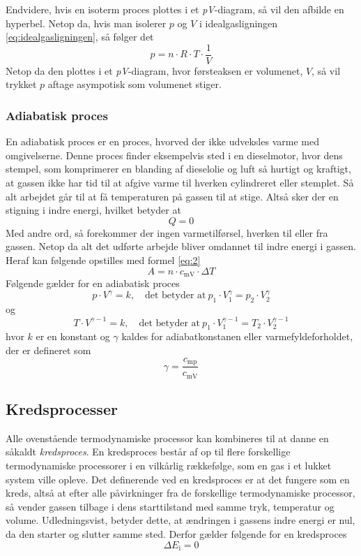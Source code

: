 \documentclass[SRC.tex]{subfiles}
\begin{document}
	Endvidere, hvis en isoterm proces plottes i et \textit{pV}-diagram, så 
	vil den afbilde en hyperbel. Netop da, hvis man isolerer \(p\) og \(V\)
	i idealgasligningen \eqref{eq:idealgasligningen}, så følger det
	\begin{equation}
	p = n \cdot R \cdot T \cdot \frac{1}{V}
	\end{equation}
	Netop da den plottes i et \textit{pV}-diagram, hvor førsteaksen er volumenet,
	\(V\), så vil trykket \(p\) aftage asympotisk som volumenet stiger. 
	\subsubsection{Adiabatisk proces}
	En adiabatisk proces er en proces, hvorved der ikke udveksles varme med 
	omgivelserne. Denne proces finder eksempelvis sted i en dieselmotor, hvor dens 
	stempel, som komprimerer en blanding af dieselolie og luft så hurtigt og kraftigt,
	at gassen ikke har tid til at afgive varme til hverken cylindreret eller stemplet. Så alt arbejdet går til at få temperaturen på gassen til at stige. Altså sker der en stigning i indre energi, hvilket betyder at 
	\begin{equation}
	Q = 0
	\end{equation}
	Med andre ord, så forekommer der ingen varmetilførsel, hverken til eller fra gassen. Netop da 
	alt det udførte arbejde bliver omdannet til indre energi i gassen. Heraf kan
	følgende opstilles med formel \eqref{eq:2}
	\begin{equation}
	A = n \cdot c_{\text{mV}} \cdot \Delta T 
	\end{equation}
	Følgende gælder for en adiabatisk proces
	\begin{equation}
	p \cdot V^\gamma = k,\quad \text{det betyder at}\ p_1 \cdot V_1^\gamma= p_2 \cdot V_2^\gamma
	\end{equation}
	og 
	\begin{equation}
	T \cdot V^{\gamma-1} = k,\quad \text{det betyder at}\ p_1 \cdot V_1^{\gamma-1}= T_2 \cdot V_2^{\gamma-1}
	\end{equation}
	hvor \(k\) er en konstant og \(\gamma\) kaldes
	for adiabatkonstanen eller varmefyldeforholdet, der er defineret som
	\begin{equation}
	\gamma = \frac{c_{\textrm{mp}}}{c_{\textrm{mV}}}
	\end{equation}
	\subsection{Kredsprocesser}
	Alle ovenstående termodynamiske processor kan kombineres til at danne
	en såkaldt \textit{kredsproces}. En kredsproces består af op til flere 
	forskellige termodynamiske processorer i en vilkårlig rækkefølge, som en gas i 
	et lukket system ville opleve. Det definerende ved en kredsproces er at det fungere som en kreds, altså at efter alle påvirkninger
	fra de forskellige termodynamiske processor, så vender gassen tilbage i dens starttilstand med
	samme tryk, temperatur og volume. Udledningsvist, betyder dette, at ændringen 
	i gassens indre energi er nul, da den starter og slutter samme sted. Derfor gælder følgende for en kredsproces
	\begin{equation}
	\Delta E_\text{i} = 0
	\end{equation} 
\end{document}
